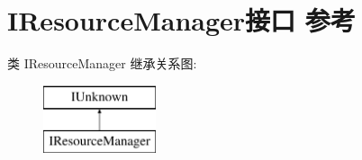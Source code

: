 \hypertarget{interface_i_resource_manager}{}\section{I\+Resource\+Manager接口 参考}
\label{interface_i_resource_manager}
类 I\+Resource\+Manager 继承关系图\+:\begin{figure}[H]
\begin{center}
\leavevmode
\includegraphics[height=2.000000cm]{interface_i_resource_manager}
\end{center}
\end{figure}
